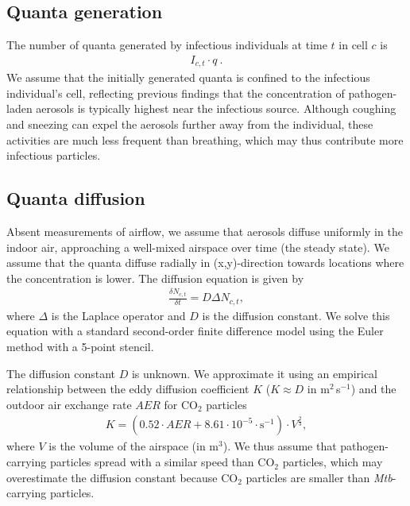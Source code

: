 \documentclass[fleqn,11pt]{wlscirep_supp}
\begin{document}
\subsection{Quanta generation}\label{sec:quanta-generation}

The number of quanta generated by infectious individuals at time $t$ in cell $c$ is 
\begin{align}\label{eq:generation}
    I_{c,t} \cdot q ~.
\end{align}
We assume that the initially generated quanta is confined to the infectious individual's cell, reflecting previous findings that the concentration of pathogen-laden aerosols is typically highest near the infectious source\cite{Wang2021Science,Morawska2021,Vuorinen2020SafSci,Chen2020BuildEnv}. Although coughing and sneezing can expel the aerosols further away from the individual, these activities are much less frequent than breathing, which may thus contribute more infectious particles\cite{Dinkele2022AJRCCM}. 

\subsection{Quanta diffusion}\label{sec:quanta-diffusion}

Absent measurements of airflow, we assume that aerosols diffuse uniformly in the indoor air, approaching a well-mixed airspace over time (the steady state). We assume that the quanta diffuse radially in (x,y)-direction towards locations where the concentration is lower. The diffusion equation is given by 
\begin{align}\label{eq:diffusion}
    \frac{\delta N_{c,t}}{\delta t} = D \Delta N_{c,t},
\end{align}
where $\Delta$ is the Laplace operator and $D$ is the diffusion constant. We solve this equation with a standard second-order finite difference model using the Euler method with a 5-point stencil. 

The diffusion constant $D$ is unknown. We approximate it using an empirical relationship between the eddy diffusion coefficient $K$ ($K \approx D$ in m$^2$\,s$^{-1}$) and the outdoor air exchange rate $AER$ for CO$_2$ particles\cite{Cheng2011EnvSciTech,Foat2020BE}
\begin{align}
    K = (0.52 \cdot AER + 8.61\cdot10^{-5} \cdot \text{s}^{-1}) \cdot V^{\frac{2}{3}},
\end{align}
where $V$ is the volume of the airspace (in m$^3$). We thus assume that pathogen-carrying particles spread with a similar speed than CO$_2$ particles, which may overestimate the diffusion constant because CO$_2$ particles are smaller than \emph{Mtb}-carrying particles.
\end{document}
